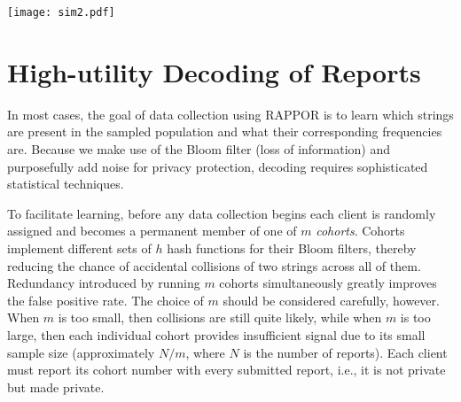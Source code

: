 \documentclass{sig-alternate-2013}
\newcommand\RAPPOR{{RAPPOR}}
\begin{document}
\begin{figure*}[!t]
\centering
\texttt{[image: sim2.pdf]}
\caption{Recall versus precision depending on choice of parameters $k$, $h$, and $m$. The first panel shows the true population distribution from which \RAPPOR{} reports were sampled. The other three panels vary one of the parameters while keeping the other two fixed. Best precision and recall are achieved with using 2 hash functions, while the choices of $k$ and $m$ do not show clear preferences.}
\label{fig:sim}
\end{figure*}

\section{High-utility Decoding of Reports}\label{sec:decoding}
In most cases, the goal of data collection using \RAPPOR{} is to learn which strings are present in the sampled population and what their corresponding frequencies are. Because we make use of the Bloom filter (loss of information) and purposefully add noise for privacy protection, decoding requires sophisticated statistical techniques.

To facilitate learning, before any data collection begins each client is randomly assigned and becomes a permanent member of one of $m$ \emph{cohorts}. Cohorts implement different sets of $h$ hash functions for their Bloom filters, thereby reducing the chance of accidental collisions of two strings across all of them. Redundancy introduced by running $m$ cohorts simultaneously greatly improves the false positive rate. The choice of $m$ should be considered carefully, however. When $m$ is too small, then collisions are still quite likely, while when $m$ is too large, then each individual cohort provides insufficient signal due to its small sample size (approximately $N/m$, where $N$ is the number of reports). Each client must report its cohort number with every submitted report, i.e., it is not private but made private.
\end{document}
